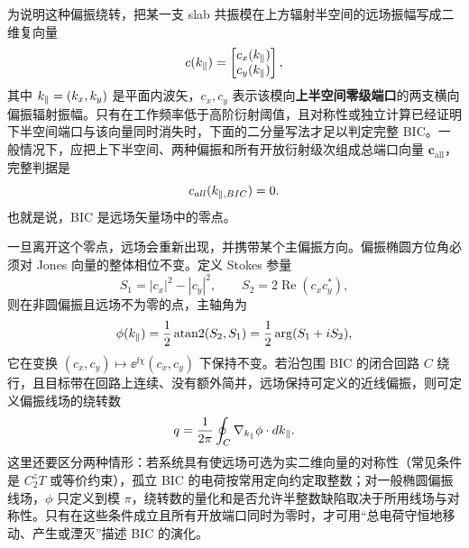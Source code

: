 为说明这种偏振绕转，把某一支 slab 共振模在上方辐射半空间的远场振幅写成二维复向量
\begin{equation}
c(k_\parallel)
=
\begin{bmatrix}
c_x(k_\parallel)\\
c_y(k_\parallel)
\end{bmatrix},
\label{eq:bic_farfield_vector}
\end{equation}
其中 $k_\parallel=(k_x,k_y)$ 是平面内波矢，$c_x,c_y$ 表示该模向\textbf{上半空间零级端口}的两支横向偏振辐射振幅。只有在工作频率低于高阶衍射阈值，且对称性或独立计算已经证明下半空间端口与该向量同时消失时，下面的二分量写法才足以判定完整 BIC。一般情况下，应把上下半空间、两种偏振和所有开放衍射级次组成总端口向量 $\bm c_{\mathrm{all}}$，完整判据是
\begin{equation}
c_{all}(k_{\parallel,BIC})=0.
\label{eq:bic_farfield_zero}
\end{equation}
也就是说，BIC 是远场矢量场中的零点。

一旦离开这个零点，远场会重新出现，并携带某个主偏振方向。偏振椭圆方位角必须对 Jones 向量的整体相位不变。定义 Stokes 参量
\begin{equation}
S_1=|c_x|^2-|c_y|^2,
\qquad
S_2=2\operatorname{Re}(c_xc_y^*),
\label{eq:bic_stokes_s1s2}
\end{equation}
则在非圆偏振且远场不为零的点，主轴角为
\begin{equation}
\phi(k_\parallel)
=
\frac{1}{2}\operatorname{atan2}(S_2,S_1)
=\frac{1}{2}\arg(S_1+i S_2),
\label{eq:bic_polarization_angle}
\end{equation}
它在变换 $(c_x,c_y)\mapsto\ee^{\ii\chi}(c_x,c_y)$ 下保持不变。若沿包围 BIC 的闭合回路 $C$ 绕行，且目标带在回路上连续、没有额外简并，远场保持可定义的近线偏振，则可定义偏振线场的绕转数
\begin{equation}
q
=
\frac{1}{2\pi}\oint_C \nabla_{k_\parallel}\phi\cdot d k_\parallel.
\label{eq:bic_topological_charge}
\end{equation}
这里还要区分两种情形：若系统具有使远场可选为实二维向量的对称性（常见条件是 $C_2^zT$ 或等价约束），孤立 BIC 的电荷按常用定向约定取整数；对一般椭圆偏振线场，$\phi$ 只定义到模 $\pi$，绕转数的量化和是否允许半整数缺陷取决于所用线场与对称性。只有在这些条件成立且所有开放端口同时为零时，才可用“总电荷守恒地移动、产生或湮灭”描述 BIC 的演化\cite{zhen2014topological,hsu2016,yang2014bic}。


